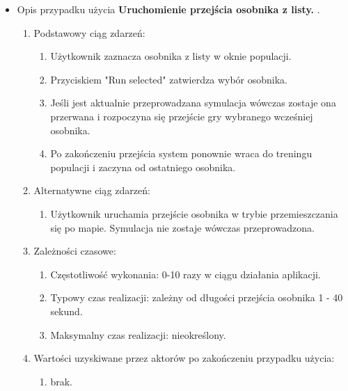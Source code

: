 \begin{par}
\begin{itemize}
	\item
	Opis przypadku użycia {\bf Uruchomienie przejścia osobnika z listy. }.
	\begin{enumerate}
	\item Podstawowy ciąg zdarzeń:
		\begin{enumerate}
		\item Użytkownik zaznacza osobnika z listy w oknie populacji.
		\item Przyciskiem "Run selected" zatwierdza wybór osobnika.
		\item Jeśli jest aktualnie przeprowadzana symulacja wówczas zostaje ona przerwana i rozpoczyna się przejście gry wybranego wcześniej osobnika.
		\item Po zakończeniu przejścia system ponownie wraca do treningu populacji i zaczyna od ostatniego osobnika.
		\end{enumerate}
	\item Alternatywne ciąg zdarzeń:
		\begin{enumerate}
		\item Użytkownik uruchamia przejście osobnika w trybie przemieszczania się po mapie. Symulacja nie zostaje wówczas przeprowadzona.
		\end{enumerate}
	\item Zależności czasowe:
		\begin{enumerate}
		\item Częstotliwość wykonania: 0-10 razy w ciągu działania aplikacji.
		\item Typowy czas realizacji: zależny od długości przejścia osobnika 1 - 40 sekund.
		\item Maksymalny czas realizacji: nieokreślony.
		\end{enumerate}
	\item Wartości uzyskiwane przez aktorów po zakończeniu przypadku użycia:
		\begin{enumerate}
		\item brak.
		\end{enumerate}
	\end{enumerate}

	\end{itemize}
\end{par}

